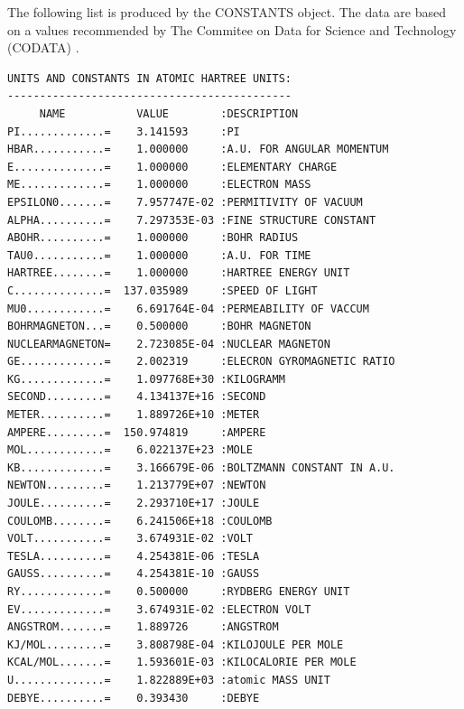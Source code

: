 \documentclass[final,12pt]{article}
\begin{document}
{{{{{{The following list is produced by the CONSTANTS object.  The data are
based on a values recommended by The Commitee on Data for Science and
Technology (CODATA) \cite{mohr00_rmp72_351}.
\begin{verbatim}
UNITS AND CONSTANTS IN ATOMIC HARTREE UNITS:
--------------------------------------------
     NAME           VALUE        :DESCRIPTION
PI.............=    3.141593     :PI
HBAR...........=    1.000000     :A.U. FOR ANGULAR MOMENTUM
E..............=    1.000000     :ELEMENTARY CHARGE
ME.............=    1.000000     :ELECTRON MASS
EPSILON0.......=    7.957747E-02 :PERMITIVITY OF VACUUM
ALPHA..........=    7.297353E-03 :FINE STRUCTURE CONSTANT
ABOHR..........=    1.000000     :BOHR RADIUS
TAU0...........=    1.000000     :A.U. FOR TIME
HARTREE........=    1.000000     :HARTREE ENERGY UNIT
C..............=  137.035989     :SPEED OF LIGHT
MU0............=    6.691764E-04 :PERMEABILITY OF VACCUM
BOHRMAGNETON...=    0.500000     :BOHR MAGNETON
NUCLEARMAGNETON=    2.723085E-04 :NUCLEAR MAGNETON
GE.............=    2.002319     :ELECRON GYROMAGNETIC RATIO
KG.............=    1.097768E+30 :KILOGRAMM      
SECOND.........=    4.134137E+16 :SECOND     
METER..........=    1.889726E+10 :METER
AMPERE.........=  150.974819     :AMPERE           
MOL............=    6.022137E+23 :MOLE
KB.............=    3.166679E-06 :BOLTZMANN CONSTANT IN A.U.
NEWTON.........=    1.213779E+07 :NEWTON
JOULE..........=    2.293710E+17 :JOULE
COULOMB........=    6.241506E+18 :COULOMB
VOLT...........=    3.674931E-02 :VOLT
TESLA..........=    4.254381E-06 :TESLA
GAUSS..........=    4.254381E-10 :GAUSS
RY.............=    0.500000     :RYDBERG ENERGY UNIT
EV.............=    3.674931E-02 :ELECTRON VOLT
ANGSTROM.......=    1.889726     :ANGSTROM
KJ/MOL.........=    3.808798E-04 :KILOJOULE PER MOLE
KCAL/MOL.......=    1.593601E-03 :KILOCALORIE PER MOLE
U..............=    1.822889E+03 :atomic MASS UNIT 
DEBYE..........=    0.393430     :DEBYE



\end{verbatim}}}}}}}
\end{document}
